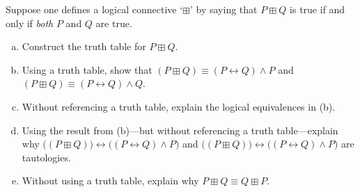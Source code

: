 \documentclass[11pt,letterpaper]{article}
\begin{document}
\newpage



 Suppose one defines a logical connective `$\boxplus$' by saying that $P \boxplus Q$ is true if and only if \textit{both} $P$ and $Q$ are true.
	\begin{enumerate}[(a)]
	\item Construct the truth table for $P \boxplus Q$.
	\item Using a truth table, show that $(P \boxplus Q) \equiv (P \leftrightarrow Q) \wedge P$ and $(P \boxplus Q) \equiv (P \leftrightarrow Q) \wedge Q$.
	\item Without referencing a truth table, explain the logical equivalences in (b).
	\item Using the result from (b)---but without referencing a truth table---explain why $\big( (P \boxplus Q) \big) \leftrightarrow \big( (P \leftrightarrow Q) \wedge P \big)$ and $\big( (P \boxplus Q) \big) \leftrightarrow \big( (P \leftrightarrow Q) \wedge P \big)$ are tautologies. 
	\item Without using a truth table, explain why $P \boxplus Q \equiv Q \boxplus P$.
	\end{enumerate} \pspace
\end{document}

